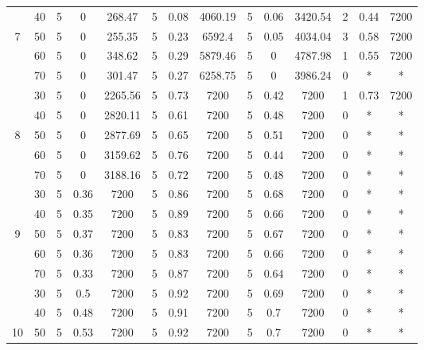 \documentclass{itor}
\theoremstyle{definition}
\theoremstyle{remark}
\begin{document}
\begin{table}[htbp]
\begin{tabular}{|c|c|cccccc|cccccc|}
          & 40    & 5     & 0     & 268.47 & 5     & 0.08  & 4060.19 & 5     & 0.06  & 3420.54 & 2     & 0.44  & 7200 \\
    7     & 50    & 5     & 0     & 255.35 & 5     & 0.23  & 6592.4 & 5     & 0.05  & 4034.04 & 3     & 0.58  & 7200 \\
          & 60    & 5     & 0     & 348.62 & 5     & 0.29  & 5879.46 & 5     & 0     & 4787.98 & 1     & 0.55  & 7200 \\
          & 70    & 5     & 0     & 301.47 & 5     & 0.27  & 6258.75 & 5     & 0     & 3986.24 & 0     & *     & * \\
    \midrule
          & 30    & 5     & 0     & 2265.56 & 5     & 0.73  & 7200  & 5     & 0.42  & 7200  & 1     & 0.73  & 7200 \\
          & 40    & 5     & 0     & 2820.11 & 5     & 0.61  & 7200  & 5     & 0.48  & 7200  & 0     & *     & * \\
    8     & 50    & 5     & 0     & 2877.69 & 5     & 0.65  & 7200  & 5     & 0.51  & 7200  & 0     & *     & * \\
          & 60    & 5     & 0     & 3159.62 & 5     & 0.76  & 7200  & 5     & 0.44  & 7200  & 0     & *     & * \\
          & 70    & 5     & 0     & 3188.16 & 5     & 0.72  & 7200  & 5     & 0.48  & 7200  & 0     & *     & * \\
    \midrule
          & 30    & 5     & 0.36  & 7200  & 5     & 0.86  & 7200  & 5     & 0.68  & 7200  & 0     & *     & * \\
          & 40    & 5     & 0.35  & 7200  & 5     & 0.89  & 7200  & 5     & 0.66  & 7200  & 0     & *     & * \\
    9     & 50    & 5     & 0.37  & 7200  & 5     & 0.83  & 7200  & 5     & 0.67  & 7200  & 0     & *     & * \\
          & 60    & 5     & 0.36  & 7200  & 5     & 0.83  & 7200  & 5     & 0.66  & 7200  & 0     & *     & * \\
          & 70    & 5     & 0.33  & 7200  & 5     & 0.87  & 7200  & 5     & 0.64  & 7200  & 0     & *     & * \\
    \midrule
          & 30    & 5     & 0.5   & 7200  & 5     & 0.92  & 7200  & 5     & 0.69  & 7200  & 0     & *     & * \\
          & 40    & 5     & 0.48  & 7200  & 5     & 0.91  & 7200  & 5     & 0.7   & 7200  & 0     & *     & * \\
    10    & 50    & 5     & 0.53  & 7200  & 5     & 0.92  & 7200  & 5     & 0.7   & 7200  & 0     & *     & * \\

\end{tabular}
\end{table}
\end{document}
